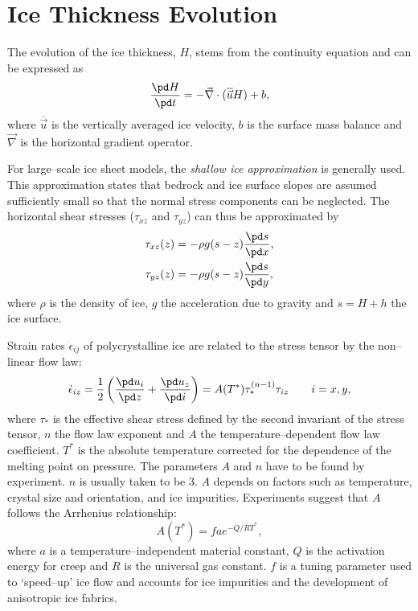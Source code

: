\section{Ice Thickness Evolution}
The evolution of the ice thickness, $H$, stems from the continuity equation and can be expressed as
\begin{equation}
  \label{kin.eq.ice_thickness}
  \frac{\pd H}{\pd t} = -\vec\nabla\cdot(\overline{\vec{u}} H) + b,
\end{equation}
where $\overline{\vec{u}}$ is the vertically averaged ice velocity, $b$ is the surface mass balance and $\vec\nabla$ is the horizontal gradient operator. 

For large--scale ice sheet models, the \emph{shallow ice approximation} is generally used. This approximation states that bedrock and ice surface slopes are assumed sufficiently small so that the normal stress components can be neglected. The horizontal shear stresses ($\tau_{xz}$ and $\tau_{yz}$) can thus be approximated by
\begin{equation}
  \label{kin.eq.horiz_shear}
  \begin{split}
    \tau_{xz}(z)&=-\rho g(s-z)\frac{\pd s}{\pd x},\\
    \tau_{yz}(z)&=-\rho g(s-z)\frac{\pd s}{\pd y},
  \end{split}
\end{equation}
where $\rho$ is the density of ice, $g$ the acceleration due to gravity and $s=H+h$ the ice surface.

Strain rates $\dot{\epsilon}_{ij}$ of polycrystalline ice are related to the stress tensor by the non--linear flow law:
\begin{equation}
  \label{kin.eq.flowlaw}
  \dot{\epsilon}_{iz}=\frac12\left(\frac{\pd u_i}{\pd z}+\frac{\pd u_z}{\pd i}\right)=A(T^\ast)\tau_\ast^{(n-1)}\tau_{iz}\qquad i=x,y,
\end{equation}
where $\tau_\ast$ is the effective shear stress defined by the second invariant of the stress tensor, $n$ the flow law exponent and $A$ the temperature--dependent flow law coefficient. $T^\ast$ is the absolute temperature corrected for the dependence of the melting point on pressure. The parameters $A$ and $n$ have to
 be found by experiment. $n$ is usually taken to be 3. $A$ depends on factors such as temperature, crystal size and orientation, and ice impurities. Experiments suggest that $A$ follows the Arrhenius relationship:
\begin{equation}
  \label{kin.eq.arrhenius}
  A(T^\ast)=fae^{-Q/RT^\ast},
\end{equation}where $a$ is a temperature--independent material constant, $Q$ is the activation energy for creep and $R$ is the universal gas constant. $f$ is a tuning parameter used to `speed--up' ice flow and accounts for ice impurities and the development of anisotropic ice fabrics.

